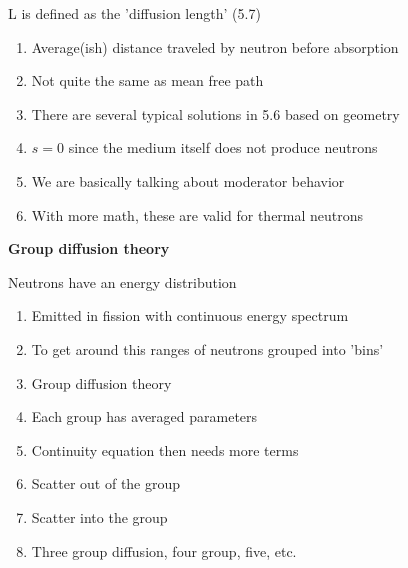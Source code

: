 \documentclass[aspectratio=1610,pdftex,dvipsnames,compress,xcolor={dvipsnames}]{beamer}
\begin{document}
\addtocounter{framenumber}{-1} 
\begin{frame}{L is defined as the 'diffusion length' (5.7)}
    \begin{enumerate}[series=outerlist,topsep=0pt,itemsep=21pt,leftmargin=*,label=(\arabic*)]
        \item[]Average(ish) distance traveled by neutron before absorption
        \item[]Not quite the same as mean free path
        \item[]There are several typical solutions in 5.6 based on geometry
        \item[]$s = 0$ since the medium itself does not produce neutrons
        \item[]We are basically talking about moderator behavior
        \item[]With more math, these are valid for thermal neutrons
    \end{enumerate}
\end{frame}


\begin{frame}[plain]{}
    \centering\LARGE\textbf{Group diffusion theory}
\end{frame}


\addtocounter{framenumber}{-1} 
\begin{frame}{Neutrons have an energy distribution}
    \begin{enumerate}[series=outerlist,topsep=0pt,itemsep=17pt,leftmargin=*,label=(\arabic*)]
        \item[]Emitted in fission with continuous energy spectrum
        \item[]To get around this ranges of neutrons grouped into 'bins'
        \item[]Group diffusion theory
        \item[]Each group has averaged parameters
        \item[]Continuity equation then needs more terms
        \item[]Scatter out of the group
        \item[]Scatter into the group
        \item[]Three group diffusion, four group, five, etc.
    \end{enumerate}
\end{frame}
\end{document}
